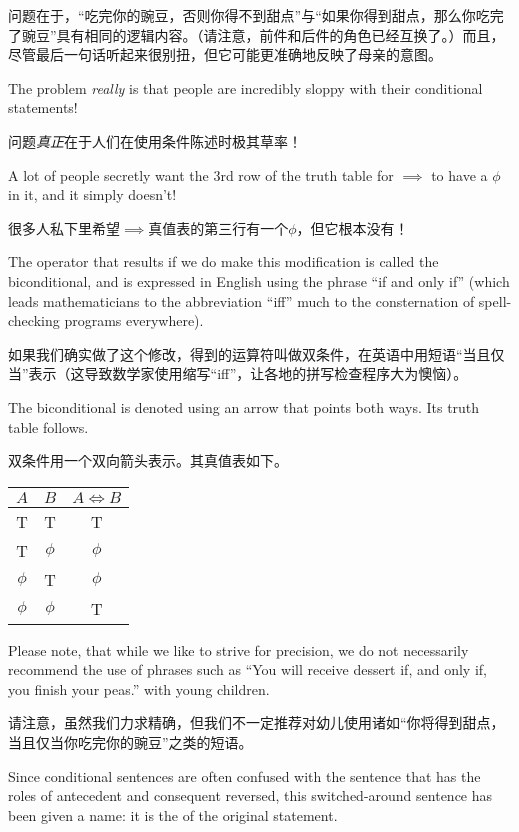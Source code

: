 问题在于，“吃完你的豌豆，否则你得不到甜点”与“如果你得到甜点，那么你吃完了豌豆”具有相同的逻辑内容。（请注意，前件和后件的角色已经互换了。）而且，尽管最后一句话听起来很别扭，但它可能更准确地反映了母亲的意图。

The problem {\em really} is that people are incredibly sloppy 
with their conditional statements!

问题{\em 真正}在于人们在使用条件陈述时极其草率！

A lot of people secretly want 
the 3rd row of the truth table for $\implies$ to have a $\phi$
in it, and it simply doesn't!

很多人私下里希望$\implies$真值表的第三行有一个$\phi$，但它根本没有！

The operator that results if we do
make this modification is called the 
biconditional, and is expressed
in English using the phrase ``if and only if'' (which leads mathematicians
to the abbreviation ``iff'' much to the consternation of 
spell-checking programs everywhere).

如果我们确实做了这个修改，得到的运算符叫做双条件，在英语中用短语“当且仅当”表示（这导致数学家使用缩写“iff”，让各地的拼写检查程序大为懊恼）。

The biconditional is denoted 
using an arrow that points both ways.  Its truth table follows.

双条件用一个双向箭头表示。其真值表如下。

\begin{center}
\begin{tabular}{c|c||c}
\; $A$ \; & \; $B$ \; & \; $A \iff B$ \; \\ \hline
T & T & T \\
T & $\phi$ & $\phi$\\
 $\phi$ & T & $\phi$ \\
 $\phi$ &  $\phi$ & T\\
\end{tabular}
\end{center}

Please note, that while we like to strive for precision, we do not
necessarily recommend the use of phrases such as 
``You will receive dessert if, and only if,
you finish your peas.'' with young children.

请注意，虽然我们力求精确，但我们不一定推荐对幼儿使用诸如“你将得到甜点，当且仅当你吃完你的豌豆”之类的短语。

Since conditional sentences are often confused with the sentence
that has the roles of antecedent and consequent reversed, this
switched-around sentence has been given a name: it is the 
of the original statement.

